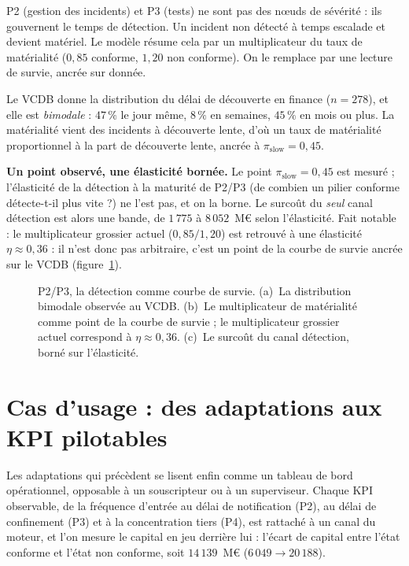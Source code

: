 P2 (gestion des incidents) et P3 (tests) ne sont pas des n\oe{}uds de sévérité : ils
gouvernent le temps de détection. Un incident non détecté à temps escalade et
devient matériel. Le modèle résume cela par un multiplicateur du taux de matérialité
($0{,}85$ conforme, $1{,}20$ non conforme). On le remplace par une lecture de survie,
ancrée sur donnée.

Le VCDB donne la distribution du délai de découverte en finance ($n=278$), et elle est
\emph{bimodale} : $47\,\%$ le jour même, $8\,\%$ en semaines, $45\,\%$ en mois ou plus. La
matérialité vient des incidents à découverte lente, d'où un taux de matérialité proportionnel
à la part de découverte lente, ancrée à $\pi_{\text{slow}}=0{,}45$.

\begin{attention}
\textbf{Un point observé, une élasticité bornée.} Le point $\pi_{\text{slow}}=0{,}45$ est
mesuré ; l'élasticité de la détection à la maturité de P2/P3 (de combien un pilier conforme
détecte-t-il plus vite ?) ne l'est pas, et on la borne. Le surcoût du \emph{seul} canal
détection est alors une bande, de $1\,775$ à $8\,052$~M\euro{} selon l'élasticité. Fait
notable : le multiplicateur grossier actuel ($0{,}85/1{,}20$) est retrouvé à une élasticité
$\eta\approx 0{,}36$ : il n'est donc pas arbitraire, c'est un point de la courbe de survie
ancrée sur le VCDB (figure~\ref{fig:detection}).
\end{attention}

\begin{figure}[htbp]\centering
{}
\caption{P2/P3, la détection comme courbe de survie. (a)~La distribution bimodale observée
au VCDB. (b)~Le multiplicateur de matérialité comme point de la courbe de survie ; le
multiplicateur grossier actuel correspond à $\eta\approx0{,}36$. (c)~Le surcoût du canal
détection, borné sur l'élasticité.}
\label{fig:detection}
\end{figure}

\section{Cas d'usage : des adaptations aux KPI pilotables}
\label{sec:kpi}

Les adaptations qui précèdent se lisent enfin comme un tableau de bord opérationnel, opposable à
un souscripteur ou à un superviseur. Chaque KPI observable, de la fréquence d'entrée au délai de
notification (P2), au délai de confinement (P3) et à la concentration tiers (P4), est rattaché à un
canal du moteur, et l'on mesure le capital en jeu derrière lui : l'écart de capital entre l'état
conforme et l'état non conforme, soit $14\,139$~M\euro{} ($6\,049 \to 20\,188$).

